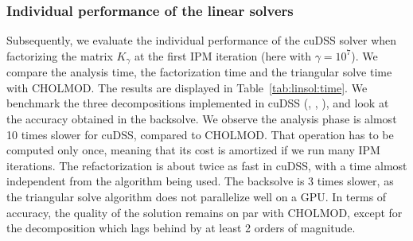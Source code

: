 \subsubsection{Individual performance of the linear solvers}
Subsequently, we evaluate the individual performance of the cuDSS solver when factorizing the matrix $K_{\gamma}$ at the first IPM iteration (here with $\gamma = 10^7$).
We compare the analysis
time, the factorization time and the triangular solve time with CHOLMOD.
The results are displayed in Table~\ref{tab:linsol:time}. We benchmark the
three decompositions implemented in cuDSS (\llt, \ldlt, \lu), and look at
the accuracy obtained in the backsolve.
We observe the analysis phase
is almost 10 times slower for cuDSS, compared to CHOLMOD.
That operation has to be computed only once, meaning that its cost is amortized if we run
many IPM iterations. The refactorization is about twice as fast in cuDSS,
with a time almost independent from the algorithm being used. The backsolve
is 3 times slower, as the triangular solve algorithm does not parallelize
well on a GPU. In terms of accuracy, the quality of the solution remains on
par with CHOLMOD, except for the \ldlt decomposition which lags behind by at least
2 orders of magnitude.


\begin{table}[!ht]
  \centering
  \caption{Comparing the performance of cuDSS with CHOLMOD.
    The matrix $K_\gamma$ is symmetric positive definite, with
    a size $n = 674,562$. The matrix is extremely sparse, with only $7,342,680$ non-zero entries ($0.002$\%).
    \label{tab:linsol:time}
    (A30 GPU)
  }
\end{table}


